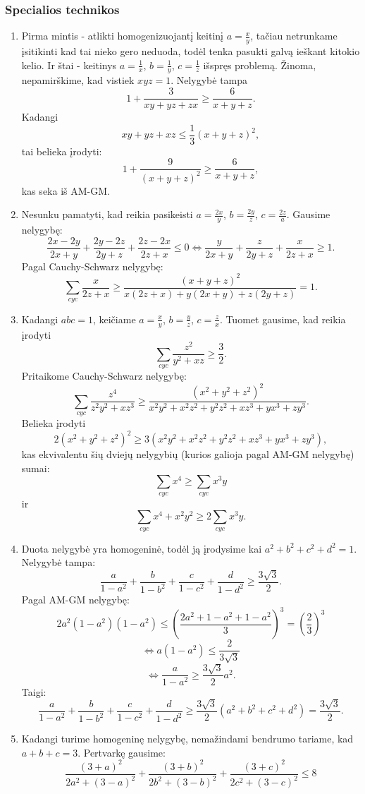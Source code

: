 \subsubsection*{Specialios technikos}
\begin{enumerate} 
\item 
Pirma mintis - atlikti homogenizuojantį keitinį $a=\frac{x}{y}$,
tačiau netrunkame įsitikinti kad tai nieko gero neduoda, todėl
tenka pasukti galvą ieškant kitokio kelio. Ir štai - keitinys
$a=\frac{1}{x}$, $b=\frac{1}{y}$, $c=\frac{1}{z}$ išspręs problemą.
Žinoma, nepamirškime, kad vistiek $xyz=1$. Nelygybė tampa
$$1+\frac{3}{xy+yz+zx}\geq\frac{6}{x+y+z}.$$ Kadangi
$$xy+yz+xz\leq\frac{1}{3}(x+y+z)^2,$$ tai belieka įrodyti:
$$1+\frac{9}{(x+y+z)^2}\geq\frac{6}{x+y+z},$$ kas seka iš AM-GM.
\item 
Nesunku pamatyti, kad reikia pasikeisti $a=\frac{2x}{y}$,
$b=\frac{2y}{z}$, $c=\frac{2z}{a}$. Gausime nelygybę:
$$\frac{2x-2y}{2x+y}+\frac{2y-2z}{2y+z}+\frac{2z-2x}{2z+x}\leq0\Leftrightarrow\frac{y}{2x+y}+\frac{z}{2y+z}+\frac{x}{2z+x}\geq1.$$
Pagal Cauchy-Schwarz nelygybę:
$$\sum_{cyc}{\frac{x}{2z+x}}\geq\frac{(x+y+z)^2}{x(2z+x)+y(2x+y)+z(2y+z)}=1.$$
\item 
Kadangi $abc=1$, keičiame $a=\frac{x}{y}$, $b=\frac{y}{z}$,
$c=\frac{z}{x}$. Tuomet gausime, kad reikia įrodyti
$$\sum_{cyc}{\frac{z^2}{y^2+xz}}\geq\frac{3}{2}.$$ Pritaikome
Cauchy-Schwarz nelygybę:
$$\sum_{cyc}{\frac{z^4}{z^2y^2+xz^3}}\geq\frac{(x^2+y^2+z^2)^2}{x^2y^2+x^2z^2+y^2z^2+xz^3+yx^3+zy^3}.$$
Belieka įrodyti
$$2(x^2+y^2+z^2)^2\geq3(x^2y^2+x^2z^2+y^2z^2+xz^3+yx^3+zy^3),$$
kas ekvivalentu šių dviejų nelygybių (kurios galioja pagal AM-GM
nelygybę) sumai: $$\sum_{cyc}{x^4}\geq\sum_{cyc}{x^3y}$$ ir
$$\sum_{cyc}{x^4+x^2y^2}\geq2\sum_{cyc}{x^3y}.$$
\item 
Duota nelygybė yra homogeninė, todėl ją įrodysime kai
$a^2+b^2+c^2+d^2=1$. Nelygybė tampa:
$$\frac{a}{1-a^2}+\frac{b}{1-b^2}+\frac{c}{1-c^2}+\frac{d}{1-d^2}\geq\frac{3\sqrt{3}}{2}.$$
Pagal AM-GM nelygybę:
$$2a^2(1-a^2)(1-a^2)\leq\left(\frac{2a^2+1-a^2+1-a^2}{3}\right)^3=\left(\frac{2}{3}\right)^3$$
$$\Leftrightarrow a(1-a^2)\leq\frac{2}{3\sqrt{3}}$$
$$\Leftrightarrow\frac{a}{1-a^2}\geq\frac{3\sqrt{3}}{2}a^2.$$ Taigi:
$$\frac{a}{1-a^2}+\frac{b}{1-b^2}+\frac{c}{1-c^2}+\frac{d}{1-d^2}\geq\frac{3\sqrt{3}}{2}(a^2+b^2+c^2+d^2)=\frac{3\sqrt{3}}{2}.$$
\item 
Kadangi turime homogeninę nelygybę, nemažindami bendrumo tariame, kad
$a+b+c=3$. Pertvarkę gausime:
$$\frac{(3+a)^2}{2a^2+(3-a)^2}+\frac{(3+b)^2}{2b^2+(3-b)^2}+\frac{(3+c)^2}{2c^2+(3-c)^2}\leq8$$

\end{enumerate}
